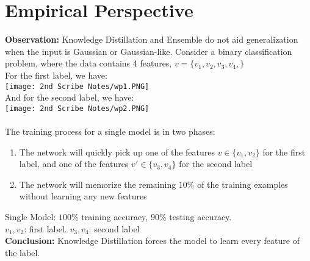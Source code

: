 \documentclass[12pt]{article}
\begin{document}
        \section{Empirical Perspective}
        \textbf{Observation:} Knowledge Distillation and Ensemble do not aid generalization when the input is Gaussian or Gaussian-like. Consider a binary classification problem, where the data contains 4 features, $v=\{v_1,v_2,v_3,v_4,\}$ \\
        For the first label, we have: \\
        \texttt{[image: 2nd Scribe Notes/wp1.PNG]} \\
        And for the second label, we have: \\
        \texttt{[image: 2nd Scribe Notes/wp2.PNG]} \\
        \\
        The training process for a single model is in two phases:
        \begin{enumerate}
            \item{The network will quickly pick up one of the features $v\in\{v_1,v_2\}$ for the first label, and one of the features $v'\in\{v_3,v_4\}$ for the second label}
            \item{The network will memorize the remaining $10\%$ of the training examples without learning any new features}
        \end{enumerate}
        Single Model: $100\%$ training accuracy, $90\%$ testing accuracy. \\
        $v_1, v_2$: first label. $v_3, v_4$: second label \\
        \textbf{Conclusion:} Knowledge Distillation forces the model to learn every feature of the label.
\end{document}

